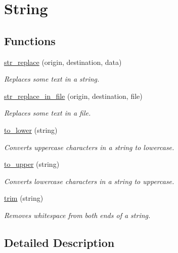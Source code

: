 \hypertarget{group__string}{}\section{String}
\label{group__string}
\subsection*{Functions}
\begin{DoxyCompactItemize}
\item 
\hyperlink{group__string_ga8a33cb1aa9a5e78d96dc840a2fb9e7aa}{str\+\_\+replace} (origin, destination, data)
\begin{DoxyCompactList}\small\item\em Replaces some text in a string. \end{DoxyCompactList}\item 
\hyperlink{group__string_gac21da88366bc39ab15e65991d7adddb5}{str\+\_\+replace\+\_\+in\+\_\+file} (origin, destination, file)
\begin{DoxyCompactList}\small\item\em Replaces some text in a file. \end{DoxyCompactList}\item 
\hyperlink{group__string_gaab92d8135788d0b552db394c4510ffd1}{to\+\_\+lower} (string)
\begin{DoxyCompactList}\small\item\em Converts uppercase characters in a string to lowercase. \end{DoxyCompactList}\item 
\hyperlink{group__string_ga47b18ef89979fd9f9f295177fbe9e9ff}{to\+\_\+upper} (string)
\begin{DoxyCompactList}\small\item\em Converts lowercase characters in a string to uppercase. \end{DoxyCompactList}\item 
\hyperlink{group__string_gaf851f60e0e4d97390e67c9c0d49e1172}{trim} (string)
\begin{DoxyCompactList}\small\item\em Removes whitespace from both ends of a string. \end{DoxyCompactList}\end{DoxyCompactItemize}


\subsection{Detailed Description}


